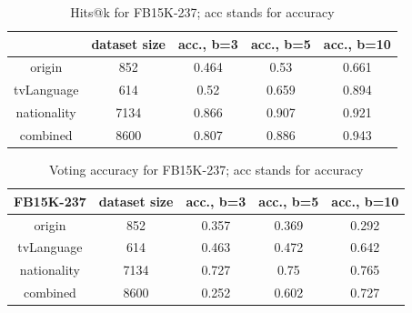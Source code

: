 \begin{table}[h!]
\centering
\caption{Hits@k for FB15K-237; acc stands for accuracy} %
\label{Tbl:searchfb}
\begin{tabular}{|c|c|c|c|c|}
\hline
            & \multicolumn{1}{l|}{dataset size} & \multicolumn{1}{l|}{acc., b=3} & \multicolumn{1}{l|}{acc., b=5} & \multicolumn{1}{l|}{acc., b=10} \\ \hline
origin      & 852                                                             & 0.464                                                      & 0.53                                                       & 0.661                                                       \\ \hline
tvLanguage  & 614                                                             & 0.52                                                       & 0.659                                                      & 0.894                                                       \\ \hline
nationality & 7134                                                            & 0.866                                                      & 0.907                                                      & 0.921                                                       \\ \hline
combined    & 8600                                                            & 0.807                                                      & 0.886                              & 0.943                               \\ \hline
\end{tabular}
\label{tabel:fb15kresults}
\end{table}

\begin{table}[h!]
\centering
\caption{Voting accuracy for FB15K-237; acc stands for accuracy} %

\label{Tbl:votingfb}
\begin{tabular}
{|c|c|c|c|c|}

\hline FB15K-237   & dataset size & acc., b=3 & acc., b=5 & acc., b=10 \\ \hline
origin      & 852                & 0.357         & 0.369                                 & 0.292                                  \\ \hline
tvLanguage  & 614                & 0.463         & 0.472                                 & 0.642                                  \\ \hline
nationality & 7134               & 0.727         & 0.75                                  & 0.765                                  \\ \hline
combined    & 8600               & 0.252         & 0.602         & 0.727          \\ \hline
\end{tabular}
\end{table}

